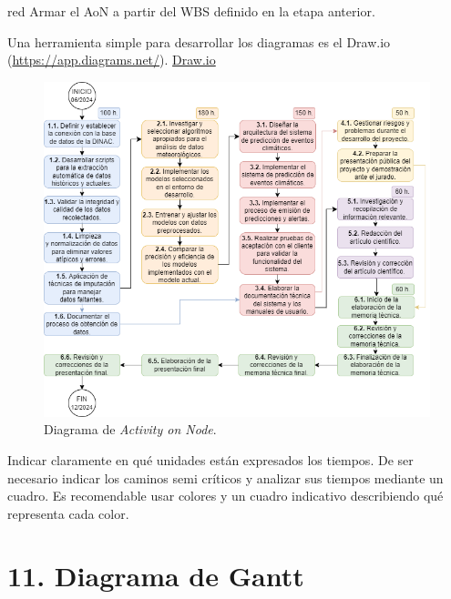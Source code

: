 \documentclass[
11pt, %
codirector, %
]{charter}
\begin{document}
\begin{consigna}{red}
Armar el AoN a partir del WBS definido en la etapa anterior.

Una herramienta simple para desarrollar los diagramas es el Draw.io (\url{https://app.diagrams.net/}).
\href{https://app.diagrams.net}{Draw.io}


\begin{figure}[htpb]
\centering 
\includegraphics[width=.8\textwidth]{./Figuras/AoN.png}
\caption{Diagrama de \textit{Activity on Node}.}
\label{fig:AoN}
\end{figure}

Indicar claramente en qué unidades están expresados los tiempos.
De ser necesario indicar los caminos semi críticos y analizar sus tiempos mediante un cuadro.
Es recomendable usar colores y un cuadro indicativo describiendo qué representa cada color.

\end{consigna}

\section{11. Diagrama de Gantt}
\label{sec:gantt}
\end{document}

